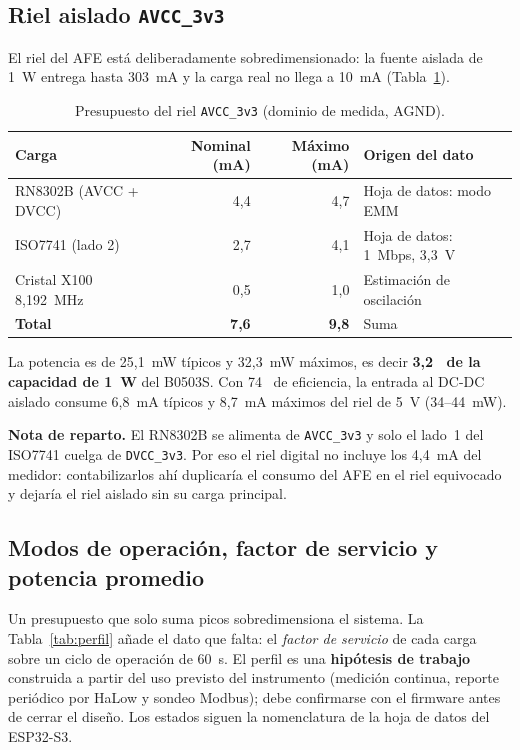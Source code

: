 \documentclass[11pt,a4paper]{article}
\newcommand{\pct}{\text{\char37}}
\begin{document}
\subsection{Riel aislado \texttt{AVCC\_3v3}}

El riel del AFE está deliberadamente sobredimensionado: la fuente aislada de
1~W entrega hasta 303~mA y la carga real no llega a 10~mA
(Tabla~\ref{tab:avcc}).

\begin{table}[H]
\centering
\caption{Presupuesto del riel \texttt{AVCC\_3v3} (dominio de medida, AGND).}
\label{tab:avcc}
\small
\begin{tabularx}{\textwidth}{@{}X r r l@{}}
\toprule
\textbf{Carga} & \textbf{Nominal (mA)} & \textbf{Máximo (mA)} & \textbf{Origen del dato} \\
\midrule
RN8302B (AVCC + DVCC) & 4,4 & 4,7 & Hoja de datos: modo EMM \\
ISO7741 (lado 2) & 2,7 & 4,1 & Hoja de datos: 1~Mbps, 3,3~V \\
Cristal X100 8,192~MHz & 0,5 & 1,0 & Estimación de oscilación \\
\midrule
\textbf{Total} & \textbf{7,6} & \textbf{9,8} & Suma \\
\bottomrule
\end{tabularx}
\end{table}

\noindent La potencia es de 25,1~mW típicos y 32,3~mW máximos, es decir
\textbf{3,2~\pct{} de la capacidad de 1~W} del B0503S. Con 74~\pct{} de
eficiencia, la entrada al DC-DC aislado consume 6,8~mA típicos y 8,7~mA máximos
del riel de 5~V (34--44~mW).

\noindent\textbf{Nota de reparto.} El RN8302B se alimenta de \texttt{AVCC\_3v3} y
solo el lado~1 del ISO7741 cuelga de \texttt{DVCC\_3v3}. Por eso el riel digital
no incluye los 4,4~mA del medidor: contabilizarlos ahí duplicaría el consumo del
AFE en el riel equivocado y dejaría el riel aislado sin su carga principal.

\subsection{Modos de operación, factor de servicio y potencia promedio}
\label{sec:promedio}

Un presupuesto que solo suma picos sobredimensiona el sistema. La
Tabla~\ref{tab:perfil} añade el dato que falta: el \emph{factor de servicio} de
cada carga sobre un ciclo de operación de 60~s. El perfil es una
\textbf{hipótesis de trabajo} construida a partir del uso previsto del
instrumento (medición continua, reporte periódico por HaLow y sondeo Modbus);
debe confirmarse con el firmware antes de cerrar el diseño. Los estados siguen
la nomenclatura de la hoja de datos del ESP32-S3.
\end{document}

